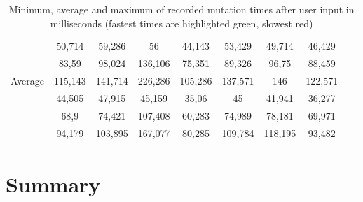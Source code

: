 \documentclass[a4paper, 12pt]{article}
\begin{document}
\begin{table}[h]
{\begin{adjustbox}{angle=0}
{\begin{tabular}{|l|c|c|c|c|c|c|c|r|}
                 \hline
                                                     & 50,714  & 59,286                    & 56                        & 44,143                  & 53,429  & 49,714  & 46,429  & ~       \\
                                                     & 83,59   & 98,024                    & 136,106                   & 75,351                  & 89,326  & 96,75   & 88,459  & ~       \\
                 \multirow{-3}{*}{Average}           & 115,143 & 141,714                   & 226,286                   & 105,286                 & 137,571 & 146     & 122,571 & ~       \\ \hline
\rowcolor{white}                                     & 44,505  & 47,915                    & 45,159                    & 35,06                   & 45      & 41,941  & 36,277  & ~       \\
\rowcolor{white}                                     & 68,9    & 74,421                    & 107,408                   & 60,283                  & 74,989  & 78,181  & 69,971  & ~       \\
\rowcolor{white} \multirow{-3}{*}{Weighted average}  & 94,179  & 103,895                   & 167,077                   & 80,285                  & 109,784 & 118,195 & 93,482  & ~       \\ \hline
      \end{tabular}
    }
  \end{adjustbox}
  \caption{Minimum, average and maximum of recorded mutation times after user input in milliseconds (fastest times are highlighted green, slowest red)}
  \label{tab:mutations:times}
  }
\end{table}

\section{Summary}
\end{document}
